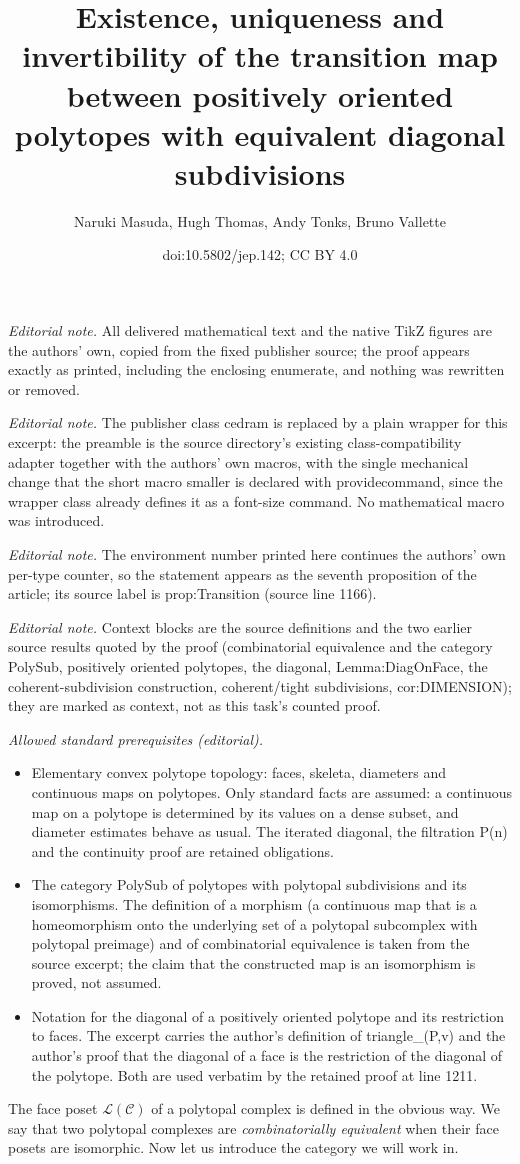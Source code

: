 \documentclass[10pt,a4paper]{amsart}
\title{Existence, uniqueness and invertibility of the transition map between positively oriented polytopes with equivalent diagonal subdivisions}
\author{Naruki Masuda, Hugh Thomas, Andy Tonks, Bruno Vallette}
\date{doi:10.5802/jep.142; CC BY 4.0}
\numberwithin{equation}{section}\providecommand{\No}{}
\let\mathcal\mathscr
\theoremstyle{plain}
\theoremstyle{definition}
\newcommand{\La}{\mathcal{L}}
\newcommand{\sC}{\mathcal{C}}
\begin{document}
\maketitle
\setcounter{proposition}{6}
\noindent\textit{Editorial note.} All delivered mathematical text and the native TikZ figures are the authors' own, copied from the fixed publisher source; the proof appears exactly as printed, including the enclosing enumerate, and nothing was rewritten or removed.\par\medskip
\noindent\textit{Editorial note.} The publisher class cedram is replaced by a plain wrapper for this excerpt: the preamble is the source directory's existing class-compatibility adapter together with the authors' own macros, with the single mechanical change that the short macro smaller is declared with providecommand, since the wrapper class already defines it as a font-size command. No mathematical macro was introduced.\par\medskip
\noindent\textit{Editorial note.} The environment number printed here continues the authors' own per-type counter, so the statement appears as the seventh proposition of the article; its source label is prop:Transition (source line 1166).\par\medskip
\noindent\textit{Editorial note.} Context blocks are the source definitions and the two earlier source results quoted by the proof (combinatorial equivalence and the category PolySub, positively oriented polytopes, the diagonal, Lemma:DiagOnFace, the coherent-subdivision construction, coherent/tight subdivisions, cor:DIMENSION); they are marked as context, not as this task's counted proof.\par\medskip
\noindent\textit{Allowed standard prerequisites (editorial).}\begin{itemize}
\item Elementary convex polytope topology: faces, skeleta, diameters and continuous maps on polytopes. Only standard facts are assumed: a continuous map on a polytope is determined by its values on a dense subset, and diameter estimates behave as usual. The iterated diagonal, the filtration P(n) and the continuity proof are retained obligations.
\item The category PolySub of polytopes with polytopal subdivisions and its isomorphisms. The definition of a morphism (a continuous map that is a homeomorphism onto the underlying set of a polytopal subcomplex with polytopal preimage) and of combinatorial equivalence is taken from the source excerpt; the claim that the constructed map is an isomorphism is proved, not assumed.
\item Notation for the diagonal of a positively oriented polytope and its restriction to faces. The excerpt carries the author's definition of triangle\_(P,v) and the author's proof that the diagonal of a face is the restriction of the diagonal of the polytope. Both are used verbatim by the retained proof at line 1211.
\end{itemize}\medskip
The face poset $\La(\sC)$ of a polytopal complex is defined in the obvious way.
We say that two polytopal complexes are \emph{combinatorially equivalent} when their face posets are isomorphic.
Now let us introduce the category we will work in.
\end{document}
